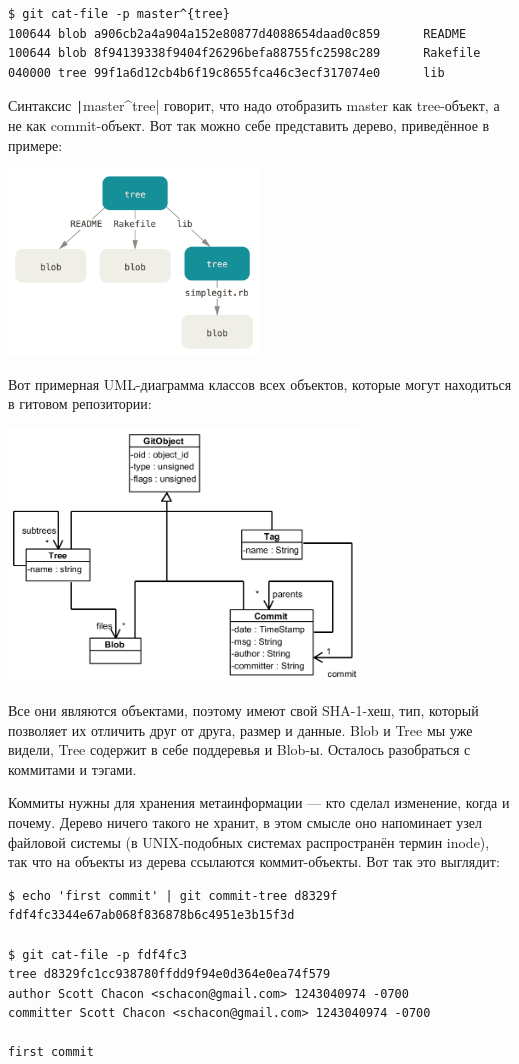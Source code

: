 \documentclass[a5paper]{article}
\begin{document}
\begin{verbatim}
$ git cat-file -p master^{tree}
100644 blob a906cb2a4a904a152e80877d4088654daad0c859      README
100644 blob 8f94139338f9404f26296befa88755fc2598c289      Rakefile
040000 tree 99f1a6d12cb4b6f19c8655fca46c3ecf317074e0      lib
\end{verbatim}

Синтаксис \texttt|master^{tree}| говорит, что надо отобразить master как tree-объект, а не как commit-объект. Вот так можно себе представить дерево, приведённое в примере:

\begin{center}
	\includegraphics[width=0.5\textwidth]{gitTreeObject.png}
\end{center}

Вот примерная UML-диаграмма классов всех объектов, которые могут находиться в гитовом репозитории:
\begin{center}
	\includegraphics[width=0.7\textwidth]{gitDataStructure.png}
\end{center}

Все они являются объектами, поэтому имеют свой SHA-1-хеш, тип, который позволяет их отличить друг от друга, размер и данные. Blob и Tree мы уже видели, Tree содержит в себе поддеревья и Blob-ы. Осталось разобраться с коммитами и тэгами. 

Коммиты нужны для хранения метаинформации --- кто сделал изменение, когда и почему. Дерево ничего такого не хранит, в этом смысле оно напоминает узел файловой системы (в UNIX-подобных системах распространён термин inode), так что на объекты из дерева ссылаются коммит-объекты. Вот так это выглядит:
\begin{verbatim}
$ echo 'first commit' | git commit-tree d8329f
fdf4fc3344e67ab068f836878b6c4951e3b15f3d

$ git cat-file -p fdf4fc3
tree d8329fc1cc938780ffdd9f94e0d364e0ea74f579
author Scott Chacon <schacon@gmail.com> 1243040974 -0700
committer Scott Chacon <schacon@gmail.com> 1243040974 -0700

first commit
\end{verbatim}
\end{document}
